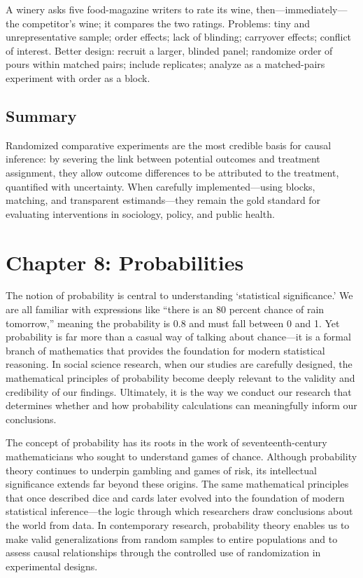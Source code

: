 \documentclass[
  letterpaper,
  DIV=11,
  numbers=noendperiod]{scrreprt}
\begin{document}
A winery asks five food-magazine writers to rate its wine,
then---immediately---the competitor's wine; it compares the two ratings.
Problems: tiny and unrepresentative sample; order effects; lack of
blinding; carryover effects; conflict of interest. Better design:
recruit a larger, blinded panel; randomize order of pours within matched
pairs; include replicates; analyze as a matched-pairs experiment with
order as a block.

\section{Summary}\label{summary-1}

Randomized comparative experiments are the most credible basis for
causal inference: by severing the link between potential outcomes and
treatment assignment, they allow outcome differences to be attributed to
the treatment, quantified with uncertainty. When carefully
implemented---using blocks, matching, and transparent estimands---they
remain the gold standard for evaluating interventions in sociology,
policy, and public health.


\chapter{Chapter 8: Probabilities}\label{chapter-8-probabilities}

The notion of probability is central to understanding `statistical
significance.' We are all familiar with expressions like ``there is an
80 percent chance of rain tomorrow,'' meaning the probability is 0.8 and
must fall between 0 and 1. Yet probability is far more than a casual way
of talking about chance---it is a formal branch of mathematics that
provides the foundation for modern statistical reasoning. In social
science research, when our studies are carefully designed, the
mathematical principles of probability become deeply relevant to the
validity and credibility of our findings. Ultimately, it is the way we
conduct our research that determines whether and how probability
calculations can meaningfully inform our conclusions.

The concept of probability has its roots in the work of
seventeenth-century mathematicians who sought to understand games of
chance. Although probability theory continues to underpin gambling and
games of risk, its intellectual significance extends far beyond these
origins. The same mathematical principles that once described dice and
cards later evolved into the foundation of modern statistical
inference---the logic through which researchers draw conclusions about
the world from data. In contemporary research, probability theory
enables us to make valid generalizations from random samples to entire
populations and to assess causal relationships through the controlled
use of randomization in experimental designs.
\end{document}
